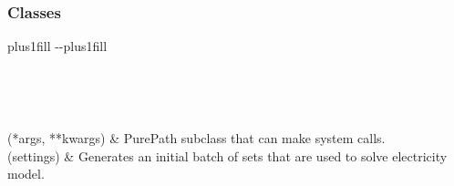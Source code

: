 \documentclass[letterpaper,10pt,english]{sphinxmanual}
\begin{document}
\subsubsection*{Classes}


\begin{savenotes}
\sphinxatlongtablestart
\sphinxthistablewithglobalstyle
\sphinxthistablewithnovlinesstyle
\makeatletter
  \LTleft \@totalleftmargin plus1fill
  \LTright\dimexpr\columnwidth-\@totalleftmargin-\linewidth\relax plus1fill
\makeatother
\begin{longtable}{}
\sphinxtoprule
\endfirsthead

\\
\sphinxtoprule
\endhead

\sphinxbottomrule
{}\\
\endfoot

\endlastfoot
\sphinxtableatstartofbodyhook

\sphinxAtStartPar
{}(*args, **kwargs)
&
\sphinxAtStartPar
PurePath subclass that can make system calls.
\\
\sphinxhline
\sphinxAtStartPar
{\hyperref[\detokenize{src.models.electricity.scripts.preprocessor:src.models.electricity.scripts.preprocessor.Sets}]{}}(settings)
&
\sphinxAtStartPar
Generates an initial batch of sets that are used to solve electricity model.
\\
\sphinxbottomrule
\end{longtable}
\sphinxtableafterendhook
\sphinxatlongtableend
\end{savenotes}
\end{document}
